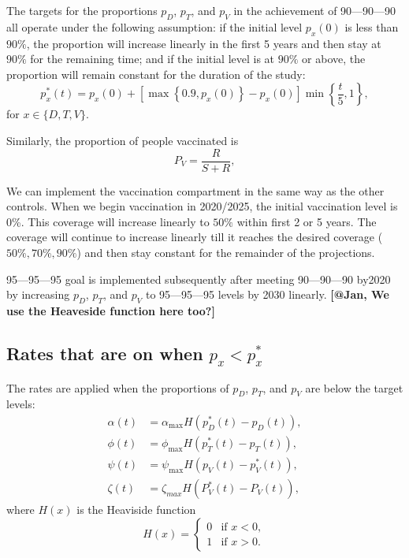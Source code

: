 \documentclass[11pt]{article}
\newcommand{\comment}[1]{\textbf{[#1]}}
\begin{document}
The targets for the proportions $p_D$, $p_T$, and $p_V$ in the achievement of 90---90---90
all operate under the following assumption:
if the initial level $p_x(0)$ is less than $90\%$, the proportion will increase
linearly in the first 5 years and then stay at $90\%$ for the
remaining time; and if the initial level is at $90\%$ or above, the proportion
will remain constant for the duration of the study:
\begin{equation}
  p_x^*(t)
  = p_x(0) + \left[
    \max\left\{0.9, p_x(0)\right\} - p_x(0)
  \right]
  \min\left\{\frac{t}{5}, 1\right\},
\end{equation}
for $x \in \{D, T, V\}$.

Similarly, the proportion of people vaccinated is
\begin{equation}
P_{V} = \frac{R}{S+R},
\end{equation}

We can implement the vaccination compartment in the same way as the other controls. When we begin
vaccination in 2020/2025, the initial vaccination level is 0\%. This
coverage will increase linearly to $50\%$ within first 2 or 5
years. The coverage will continue to increase linearly till it reaches
the desired coverage ($50\%,70\%,90\%$) and then stay constant for the
remainder of the projections.

95---95---95 goal is implemented subsequently after meeting
90---90---90 by2020 by  increasing $p_D$, $p_T$, and $p_V$ to
95---95---95 levels by 2030 linearly. \comment{@Jan, We use the
  Heaveside function here too?}


\subsection{Rates that are on when $p_x < p^*_x$}

The rates are applied when the proportions of $p_D$, $p_T$, and $p_V$ are below the target levels:
\begin{equation}
  \begin{split}
    \alpha(t) &= \alpha_{\max} H\left(p_D^*(t) - p_D(t)\right),
    \\
    \phi(t) &= \phi_{\max} H\left(p_T^*(t) - p_T(t)\right),
    \\
    \psi(t) &= \psi_{\max} H\left(p_V(t) - p_V^*(t)\right),
    \\
    \zeta(t) &= \zeta_{max} H\left(P^{*}_{V}(t)-P_{V}(t)\right),
  \end{split}
\end{equation}
where $H(x)$ is the Heaviside function
\begin{equation}
  H(x) =
  \begin{cases}
    0 & \text{if $x < 0$},
    \\
    1 & \text{if $x > 0$}.
  \end{cases}
\end{equation}
\end{document}
